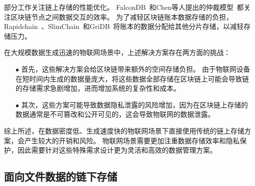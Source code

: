 部分工作关注链上存储的性能优化。
FalconDB~\cite{peng2020falcondb}和Chen等人提出的仲裁模型~\cite{chen2022blockchain}都关注区块链节点之间数据交互的效率。
为了减轻区块链账本数据存储的负担，Rapidchain~\cite{zamani2018rapidchain}、SlimChain~\cite{xu2021slimchain}和GriDB~\cite{hong2023gridb}将账本的数据分配给其他分片存储，以减轻存储压力。

在大规模数据生成迅速的物联网场景中，上述解决方案存在两方面的挑战：

\begin{itemize}
    \item[$\bullet$] 首先，这些解决方案会给区块链带来额外的空间存储负担。
    由于物联网设备在短时间内生成的数据量庞大，将这些数据全部存储在区块链上可能会导致链的存储需求急剧增加，进而增加系统的复杂性和成本。
    \item[$\bullet$] 其次，这些方案可能导致数据隐私泄露的风险增加，因为在区块链上存储的数据通常是不可篡改和公开可见的，这会导致物联网的数据泄露。
\end{itemize}

综上所述，在数据密度低、生成速度快的物联网场景下直接使用传统的链上存储方案，会产生较大的开销和风险。
物联网场景需要更加注重数据存储效率和隐私保护，因此需要针对这些特殊需求设计更为灵活和高效的数据管理方案。

\subsection{面向文件数据的链下存储}

